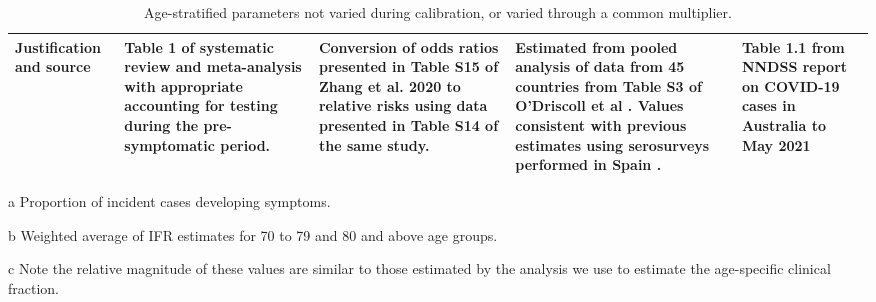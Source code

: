 \begin{table}
\begin{threeparttable}
\begin{tabularx}{\textwidth}{| X | X | X | X | X |}
        \hline
        Justification and source & 
        Table 1 of systematic review and meta-analysis with appropriate accounting for testing during the pre-symptomatic period. & 
        Conversion of odds ratios presented in Table S15 of Zhang et al. 2020 to relative risks using data presented in Table S14 of the same study.\tnote{c} &
        Estimated from pooled analysis of data from 45 countries from Table S3 of O'Driscoll et al \cite{odriscoll-2021}. 
        Values consistent with previous estimates using serosurveys performed in Spain \cite{RN21}. &
        Table 1.1 from NNDSS report on COVID-19 cases in Australia to May 2021 \\ 
        \hline
	\end{tabularx}
	\caption{Age-stratified parameters not varied during calibration, or varied through a common multiplier.}
	\label{tab:age_params}
    \begin{tablenotes}
        \item[a] Proportion of incident cases developing symptoms.
        \item[b] Weighted average of IFR estimates for 70 to 79 and 80 and above age groups.
        \item[c] Note the relative magnitude of these values are similar to those estimated by the analysis we use to estimate the age-specific clinical fraction.
    \end{tablenotes}
    \end{threeparttable}
\end{table}
